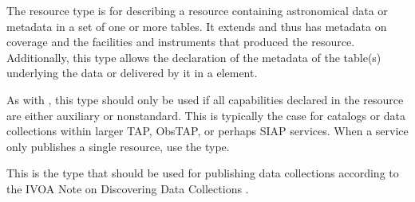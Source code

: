 \documentclass[11pt,a4paper]{ivoa}
\begin{document}
The  resource type is for describing a
resource containing astronomical data or metadata in a set of one or
more tables.  It extends  and thus has metadata
on coverage and the facilities and instruments that produced the
resource.  Additionally, this type allows the
declaration of the metadata of the table(s) underlying the data or
delivered by it in a  element.

As with , this type should only be used if all
capabilities declared in the resource are either auxiliary or
nonstandard.  This is typically the case for catalogs or data
collections within larger TAP, ObsTAP, or perhaps SIAP services.  When
a service only publishes a single resource, use the
 type.

This is the type that should be used for publishing data collections
according to the IVOA Note on Discovering Data Collections 
\citep{note:DataCollect}.
\end{document}

